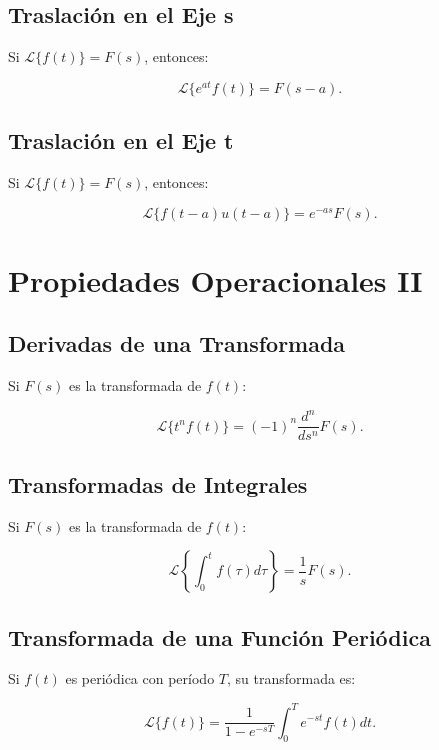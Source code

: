 \subsection{Traslación en el Eje s}
Si \( \mathcal{L} \{ f(t) \} = F(s) \), entonces:

\begin{equation}
\mathcal{L} \{ e^{at} f(t) \} = F(s-a).
\end{equation}

\subsection{Traslación en el Eje t}
Si \( \mathcal{L} \{ f(t) \} = F(s) \), entonces:

\begin{equation}
\mathcal{L} \{ f(t-a) u(t-a) \} = e^{-as} F(s).
\end{equation}

\section{Propiedades Operacionales II}
\subsection{Derivadas de una Transformada}
Si \( F(s) \) es la transformada de \( f(t) \):

\begin{equation}
\mathcal{L} \{ t^n f(t) \} = (-1)^n \frac{d^n}{ds^n} F(s).
\end{equation}

\subsection{Transformadas de Integrales}
Si \( F(s) \) es la transformada de \( f(t) \):

\begin{equation}
\mathcal{L} \left\{ \int_0^t f(\tau) d\tau \right\} = \frac{1}{s} F(s).
\end{equation}

\subsection{Transformada de una Función Periódica}
Si \( f(t) \) es periódica con período \( T \), su transformada es:

\begin{equation}
\mathcal{L} \{ f(t) \} = \frac{1}{1 - e^{-sT}} \int_0^T e^{-st} f(t) dt.
\end{equation}

